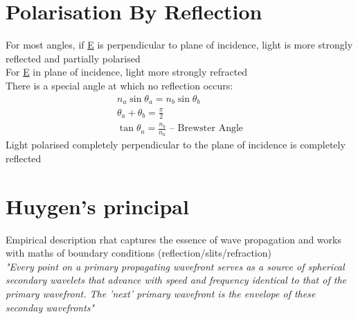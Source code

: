 \documentclass[a4paper, 11pt, fleqn, normalem]{report}
\begin{document}
\section{Polarisation By Reflection}
For most angles, if \underline{E} is perpendicular to plane of incidence, light is more strongly reflected and partially polarised \\
For \underline{E} in plane of incidence, light more strongly refracted \\
There is a special angle at which no reflection occurs:
\begin{gather*}
    n_{a}\sin{\theta_{a}} = n_{b}\sin{\theta_{b}} \\
    \theta_{a} + \theta_{b} = \frac{\pi}{2} \\
    \tan{\theta_{a}} = \frac{n_{b}}{n_{a}}\text{ -- Brewster Angle}
\end{gather*}
Light polarised completely perpendicular to the plane of incidence is completely reflected

\section{Huygen's principal}
Empirical description rhat captures the essence of wave propagation and works with maths of boundary conditions (reflection/slits/refraction) \\
\emph{"Every point on a primary propagating wavefront serves as a source of spherical secondary wavelets that advance with speed and frequency identical to that of the primary wavefront. The 'next' primary wavefront is the envelope of these seconday wavefronts"}
\end{document}
